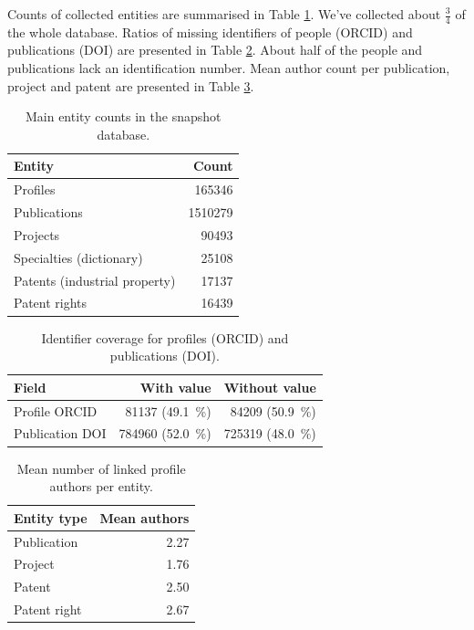 \documentclass{article}
\begin{document}
Counts of collected entities are summarised in Table \ref{tab:entity-counts}. We've collected about $\frac{3}{4}$ of the whole database. Ratios of missing identifiers of people (ORCID) and publications (DOI) are presented in Table \ref{tab:identifier-coverage}. About half of the people and publications lack an identification number. Mean author count per publication, project and patent are presented in Table \ref{tab:mean-authors}.

\begin{table}[htbp]
  \centering
  \caption{Main entity counts in the snapshot database.}
  \label{tab:entity-counts}
  \begin{tabular}{@{}lr@{}}
    \toprule
    Entity & Count \\
    \midrule
    Profiles & \num{165346} \\
    Publications & \num{1510279} \\
    Projects & \num{90493} \\
    Specialties (dictionary) & \num{25108} \\
    Patents (industrial property) & \num{17137} \\
    Patent rights & \num{16439} \\
    \bottomrule
  \end{tabular}
\end{table}

\begin{table}[htbp]
  \centering
  \caption{Identifier coverage for profiles (ORCID) and publications (DOI).}
  \label{tab:identifier-coverage}
  \begin{tabular}{@{}lrr@{}}
    \toprule
    Field & With value & Without value \\
    \midrule
    Profile ORCID & \num{81137} (\SI{49.1}{\percent}) & \num{84209} (\SI{50.9}{\percent}) \\
    Publication DOI & \num{784960} (\SI{52.0}{\percent}) & \num{725319} (\SI{48.0}{\percent}) \\
    \bottomrule
  \end{tabular}
\end{table}

\begin{table}[htbp]
  \centering
  \caption{Mean number of linked profile authors per entity.}
  \label{tab:mean-authors}
  \begin{tabular}{@{}lr@{}}
    \toprule
    Entity type & Mean authors \\
    \midrule
    Publication & \num{2.27} \\
    Project & \num{1.76} \\
    Patent & \num{2.50} \\
    Patent right & \num{2.67} \\
    \bottomrule
  \end{tabular}
\end{table}
\end{document}
